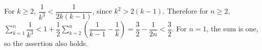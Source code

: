 For $k\ge2$, $\dfrac{1}{k^3}<\dfrac{1}{2k(k-1)}$, since $k^2>2(k-1)$. Therefore for $n\ge2$, $\sum_{k=1}^n\dfrac{1}{k^3}<1+\dfrac{1}{2}\sum_{k=2}^n(\dfrac{1}{k-1}-\dfrac{1}{k})=\dfrac{3}{2}-\dfrac{1}{2n}<\dfrac{3}{2}$. For $n=1$, the sum is one, so the assertion also holds.
